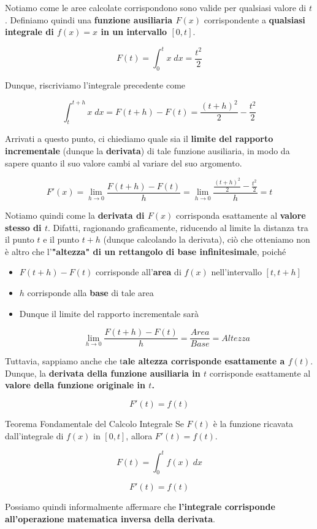 \documentclass[a4paper, 12pt]{report}
\begin{document}
    Notiamo come le aree calcolate corrispondono sono valide per qualsiasi valore di $t$. Definiamo quindi una \textbf{funzione ausiliaria $F(x)$} corrispondente a \textbf{qualsiasi integrale di $f(x) = x$ in un intervallo $[0,t]$}.
    
    \[ F(t) = \int_{0}^{t} x \; dx = \frac{t^2}{2}\]
    
    Dunque, riscriviamo l'integrale precedente come
    
    \[ \int_{t}^{t+h} x \; dx = F(t+h) - F(t) = \frac{(t+h)^2}{2} - \frac{t^2}{2}\]
    
    Arrivati a questo punto, ci chiediamo quale sia il \textbf{limite del rapporto incrementale} (dunque la \textbf{derivata}) di tale funzione ausiliaria, in modo da sapere quanto il suo valore cambi al variare del suo argomento. 
    
    \[ F'(x) = \lim_{h \to 0} \frac{F(t+h)-F(t)}{h} = \lim_{h \to 0} \frac{\frac{(t+h)^2} {2} - \frac{t^2}{2}}{h} = t\]
    
    Notiamo quindi come la \textbf{derivata di $F(x)$} corrisponda esattamente al \textbf{valore stesso di $t$}. Difatti, ragionando graficamente, riducendo al limite la distanza tra il punto $t$ e il punto $t+h$ (dunque calcolando la derivata), ciò che otteniamo non è altro che l'\textbf{"altezza" di un rettangolo di base infinitesimale}, poiché
    
    \begin{itemize}
        \item $F(t+h)-F(t)$ corrisponde all'\textbf{area} di $f(x)$ nell'intervallo $[t, t+h]$
        \item $h$ corrisponde alla \textbf{base} di tale area
        \item Dunque il limite del rapporto incrementale sarà
        
        \[ \lim_{h \to 0} \frac{F(t+h)-F(t)}{h} = \frac{Area}{Base} = Altezza\]
    \end{itemize}
    
    Tuttavia, sappiamo anche che t\textbf{ale altezza corrisponde esattamente a $f(t)$}. Dunque, la \textbf{derivata della funzione ausiliaria in $t$} corrisponde esattamente al \textbf{valore della funzione originale in $t$.}
    
    \[ F'(t) = f(t)\]
    
    \begin{framedthm}{Teorema Fondamentale del Calcolo Integrale}
        Se $F(t)$ è la funzione ricavata dall'integrale di $f(x)$ in $[0, t]$, allora $F'(t) = f(t)$.
        
        \[ F(t) = \int_{0}^{t} f(x) \; dx\]
        
        \[ F'(t) = f(t)\]
        
        Possiamo quindi informalmente affermare che \textbf{l'integrale corrisponde all'operazione matematica inversa della derivata}.
    \end{framedthm}
    
\end{document}

